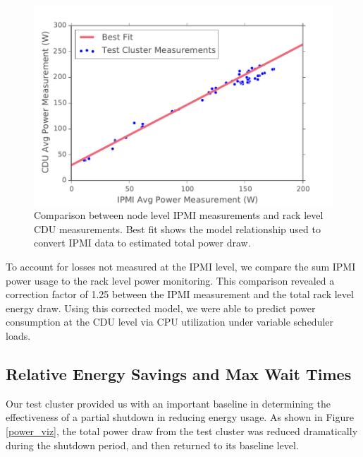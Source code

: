 \begin{figure}[t]
	\begin{center}
		\includegraphics[scale=0.55]{edeals/ipmi_v_cdu}
	\end{center}
	\caption{Comparison between node level IPMI measurements and rack level CDU measurements. Best fit shows the model relationship used to convert IPMI data to estimated total power draw.}
	\label{ipmi_v_cdu}
\end{figure}

To account for losses not measured at the IPMI level, we compare the sum IPMI power usage to the rack level power monitoring.  This comparison revealed a correction factor of 1.25 between the IPMI measurement and the total rack level energy draw.  Using this corrected model, we were able to predict power consumption at the CDU level via CPU utilization under variable scheduler loads.

\subsection{Relative Energy Savings and Max Wait Times}

Our test cluster provided us with an important baseline in determining the effectiveness of a partial shutdown in reducing energy usage. As shown in Figure \ref{power_viz}, the total power draw from the test cluster was reduced dramatically during the shutdown period, and then returned to its baseline level.  


